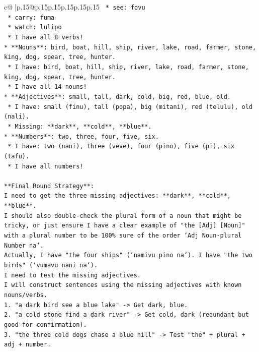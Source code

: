 \documentclass{article}
\begin{document}
{\begin{supertabular}{c@{$\;$}|p{.15\linewidth}@{}p{.15\linewidth}p{.15\linewidth}p{.15\linewidth}p{.15\linewidth}p{.15\linewidth}}
{{{\texttt{        *   see: fovu} \\
\texttt{        *   carry: fuma} \\
\texttt{        *   watch: lulipo} \\
\texttt{    *   I have all 8 verbs!} \\
\texttt{*   **Nouns**: bird, boat, hill, ship, river, lake, road, farmer, stone, king, dog, spear, tree, hunter.} \\
\texttt{    *   I have: bird, boat, hill, ship, river, lake, road, farmer, stone, king, dog, spear, tree, hunter.} \\
\texttt{    *   I have all 14 nouns!} \\
\texttt{*   **Adjectives**: small, tall, dark, cold, big, red, blue, old.} \\
\texttt{    *   I have: small (finu), tall (popa), big (mitani), red (telulu), old (nali).} \\
\texttt{    *   Missing: **dark**, **cold**, **blue**.} \\
\texttt{*   **Numbers**: two, three, four, five, six.} \\
\texttt{    *   I have: two (nani), three (veve), four (pino), five (pi), six (tafu).} \\
\texttt{    *   I have all numbers!} \\
\\ 
\texttt{**Final Round Strategy**:} \\
\texttt{I need to get the three missing adjectives: **dark**, **cold**, **blue**.} \\
\texttt{I should also double{-}check the plural form of a noun that might be tricky, or just ensure I have a clear example of "the {[}Adj{]} {[}Noun{]}" with a plural number to be 100\% sure of the order `Adj Noun{-}plural Number na`.} \\
\texttt{Actually, I have "the four ships" (`namivu pino na`). I have "the two birds" (`vumavu nani na`).} \\
\texttt{I need to test the missing adjectives.} \\
\texttt{I will construct sentences using the missing adjectives with known nouns/verbs.} \\
\texttt{1. "a dark bird see a blue lake" {-}> Get dark, blue.} \\
\texttt{2. "a cold stone find a dark river" {-}> Get cold, dark (redundant but good for confirmation).} \\
\texttt{3. "the three cold dogs chase a blue hill" {-}> Test "the" + plural + adj + number.} \\
}}}
\end{supertabular}}
\end{document}
